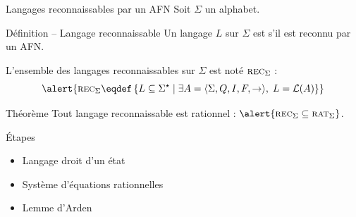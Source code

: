 
\begingroup

\begin{frame}{Langages reconnaissables par un AFN}
  Soit $\Sigma$ un alphabet.
  \begin{block}{Définition -- Langage reconnaissable}
    Un langage $L$ sur $\Sigma$ est  s'il est reconnu par un AFN. 

    L'ensemble des langages reconnaissables sur $\Sigma$ est noté \alert{$\textsc{rec}_\Sigma$} :
    $$\alert{\textsc{rec}_\Sigma \eqdef \left\{ L \subseteq \Sigma^\star \;\middle|\; \exists A = \langle \Sigma, Q, I, F, \rightarrow \rangle,\; L = \mathcal{L}(A) \right\}}$$

  \end{block}
  
  \vspace{-3mm}
  \begin{alertblock}{Théorème}
    Tout langage reconnaissable est rationnel : $\alert{\textsc{rec}_\Sigma \subseteq \textsc{rat}_\Sigma}$.
  \end{alertblock}

  \begin{center}
  \end{center}
  
  \begin{block}{Étapes}
    \begin{itemize}
    \item Langage droit d'un état
    \item Système d'équations rationnelles
    \item Lemme d'Arden
    \end{itemize}
  \end{block}
\end{frame}

\endgroup
\endinput
